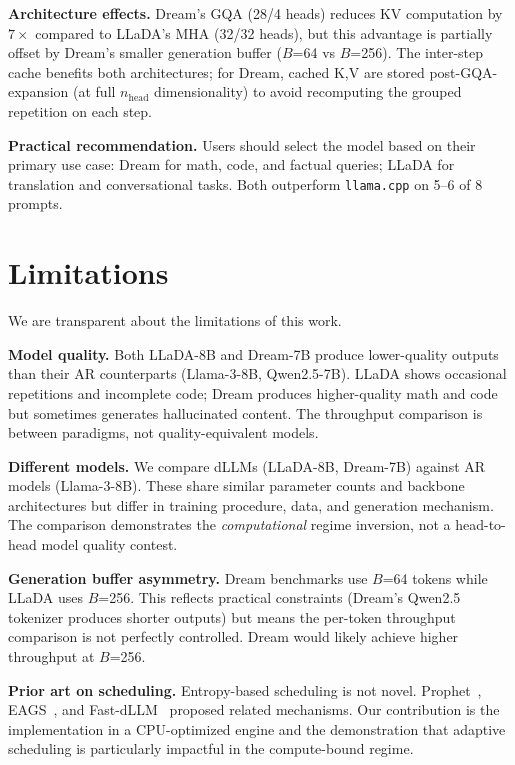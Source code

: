 \documentclass[11pt]{article}
\begin{document}
\textbf{Architecture effects.} Dream's GQA (28/4 heads) reduces KV computation by
$7\times$ compared to LLaDA's MHA (32/32 heads), but this advantage is partially offset
by Dream's smaller generation buffer ($B$=64 vs $B$=256). The inter-step cache benefits
both architectures; for Dream, cached K,V are stored post-GQA-expansion (at full
$n_\text{head}$ dimensionality) to avoid recomputing the grouped repetition on each step.

\textbf{Practical recommendation.} Users should select the model based on their primary
use case: Dream for math, code, and factual queries; LLaDA for translation and
conversational tasks. Both outperform \texttt{llama.cpp} on 5--6 of 8 prompts.


\section{Limitations}

We are transparent about the limitations of this work.

\textbf{Model quality.} Both LLaDA-8B and Dream-7B produce lower-quality outputs than
their AR counterparts (Llama-3-8B, Qwen2.5-7B). LLaDA shows occasional repetitions and
incomplete code; Dream produces higher-quality math and code but sometimes generates
hallucinated content. The throughput comparison is between paradigms, not
quality-equivalent models.

\textbf{Different models.} We compare dLLMs (LLaDA-8B, Dream-7B) against AR models
(Llama-3-8B). These share similar parameter counts and backbone architectures but differ
in training procedure, data, and generation mechanism. The comparison demonstrates the
\emph{computational} regime inversion, not a head-to-head model quality contest.

\textbf{Generation buffer asymmetry.} Dream benchmarks use $B$=64 tokens while LLaDA
uses $B$=256. This reflects practical constraints (Dream's Qwen2.5 tokenizer produces
shorter outputs) but means the per-token throughput comparison is not perfectly
controlled. Dream would likely achieve higher throughput at $B$=256.

\textbf{Prior art on scheduling.} Entropy-based scheduling is not novel.
Prophet~\cite{li2025}, EAGS~\cite{koh2024}, and Fast-dLLM~\cite{wu2025} proposed
related mechanisms. Our contribution is the implementation in a CPU-optimized engine
and the demonstration that adaptive scheduling is particularly impactful in the
compute-bound regime.
\end{document}
